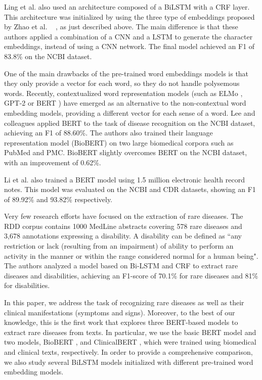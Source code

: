 \documentclass[preprint,12pt]{elsarticle}
\begin{document}
Ling et al.  \cite{ling2019domain} also used an architecture composed of a BiLSTM with a CRF layer. This architecture was  initialized by using the three type of embeddings proposed by Zhao et al. ~ \cite{zhao2017disease}, as just described above. The main difference is that these authors applied a combination of a CNN and a LSTM to generate the character embeddings, instead of using a CNN network. The final model achieved an F1 of 83.8\% on the NCBI dataset. 


One of the main drawbacks of the pre-trained word embeddings models is that they only provide a vector for each word, so they do not handle polysemous words. 
Recently, contextualized word representation models (such as ELMo \cite{peters-etal-2018-deep}, GPT-2 \cite{radford2019language} or BERT \cite{devlin-etal-2019-bert}) have emerged as an alternative to the non-contextual word embedding models, providing a different vector for each sense of a word.
Lee and colleagues  \cite{lee2020biobert} applied  BERT to the task of disease recognition on the NCBI dataset, achieving an F1 of 88.60\%. The authors also trained their language representation model (BioBERT) on two large biomedical corpora such as PubMed and PMC. BioBERT slightly overcomes BERT on the NCBI dataset, with an improvement of 0.62\%. 

Li et al.  \cite{li2019fine} also trained a BERT model using 1.5 million electronic health record notes. This model was evaluated on the NCBI and CDR datasets, showing an F1 of 89.92\% and 93.82\% respectively. 

Very few research efforts have focused on the extraction of rare diseases. The RDD corpus \cite{fabregat2018deep} contains 1000 MedLine abstracts covering 578 rare diseases and 3,678 annotations expressing a
disability. A disability  can be defined as ``any restriction or lack (resulting
from an impairment) of ability to perform an activity in the manner or within the
range considered normal for a human being"\cite{world1980international}. The authors analyzed a model based on Bi-LSTM and CRF to extract 
rare diseases and disabilities, achieving an F1-score of 70.1\% for rare diseases and 81\% for disabilities. 

In this paper, we address the task of recognizing rare diseases as well as their clinical manifestations (symptoms and signs). Moreover, to the best of our knowledge, this is the first work 
 that explores three BERT-based models to extract rare diseases from texts. 
In particular, we use the basic BERT model and two models, BioBERT \cite{lee2020biobert}, and ClinicalBERT \cite{alsentzer-etal-2019-publicly}, which were trained using biomedical and clinical texts, respectively.  In order to provide a comprehensive comparison, we also study  several BiLSTM models initialized with different pre-trained word embedding models. 
\end{document}
